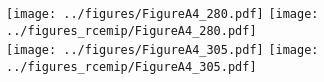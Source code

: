 \documentclass[class=minimal,border=0pt,varwidth]{standalone}
\begin{document}
\texttt{[image: ../figures/FigureA4\_280.pdf]}
\texttt{[image: ../figures\_rcemip/FigureA4\_280.pdf]}\\
\texttt{[image: ../figures/FigureA4\_305.pdf]}
\texttt{[image: ../figures\_rcemip/FigureA4\_305.pdf]}
\end{document}
